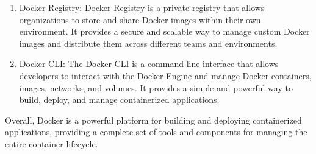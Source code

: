 \begin{enumerate}
    \item Docker Registry: Docker Registry is a private registry that allows organizations to store and share Docker images within their own environment. It provides a secure and scalable way to manage custom Docker images and distribute them across different teams and environments.
    \item Docker CLI: The Docker CLI is a command-line interface that allows developers to interact with the Docker Engine and manage Docker containers, images, networks, and volumes. It provides a simple and powerful way to build, deploy, and manage containerized applications.
\end{enumerate}

Overall, Docker is a powerful platform for building and deploying containerized applications, providing a complete set of tools and components for managing the entire container lifecycle.
